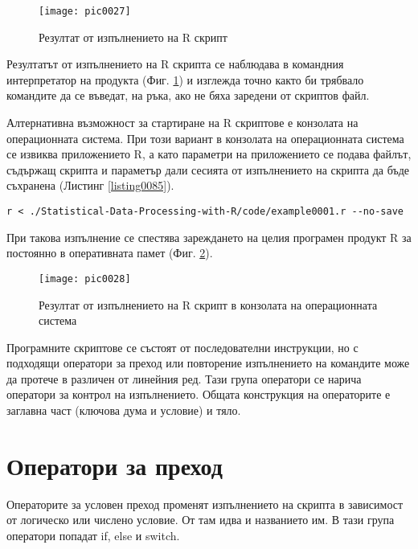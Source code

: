 \begin{figure}[h!]
  \centering
  \texttt{[image: pic0027]}
  \caption{Резултат от изпълнението на R скрипт}
\label{figure0027}
\end{figure}
\FloatBarrier

Резултатът от изпълнението на R скрипта се наблюдава в командния интерпретатор на продукта (Фиг. \ref{figure0027}) и изглежда точно както би трябвало командите да се въведат, на ръка, ако не бяха заредени от скриптов файл.

Алтернативна възможност за стартиране на R скриптове е конзолата на операционната система. При този вариант в конзолата на операционната система се извиква приложението R, а като параметри на приложението се подава файлът, съдържащ скрипта и параметър дали сесията от изпълнението на скрипта да бъде съхранена (Листинг \ref{listing0085}).

\begin{lstlisting}[caption=Изпълнение на R скрипт от конзолата на операционната система, label=listing0085]
r < ./Statistical-Data-Processing-with-R/code/example0001.r --no-save
\end{lstlisting}

При такова изпълнение се спестява зареждането на целия програмен продукт R за постоянно в оперативната памет (Фиг. \ref{figure0028}).

\begin{figure}[h!]
  \centering
  \texttt{[image: pic0028]}
  \caption{Резултат от изпълнението на R скрипт в конзолата на операционната система}
\label{figure0028}
\end{figure}
\FloatBarrier

Програмните скриптове се състоят от последователни инструкции, но с подходящи оператори за преход или повторение изпълнението на командите може да протече в различен от линейния ред. Тази група оператори се нарича оператори за контрол на изпълнението. Общата конструкция на операторите е заглавна част (ключова дума и условие) и тяло.

\section{Оператори за преход}

Операторите за условен преход променят изпълнението на скрипта в зависимост от логическо или числено условие. От там идва и названието им. В тази група оператори попадат if, else и switch.


